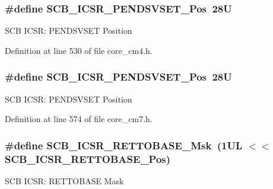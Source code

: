 \subsubsection[{\texorpdfstring{S\+C\+B\+\_\+\+I\+C\+S\+R\+\_\+\+P\+E\+N\+D\+S\+V\+S\+E\+T\+\_\+\+Pos}{SCB_ICSR_PENDSVSET_Pos}}]{\setlength{\rightskip}{0pt plus 5cm}\#define S\+C\+B\+\_\+\+I\+C\+S\+R\+\_\+\+P\+E\+N\+D\+S\+V\+S\+E\+T\+\_\+\+Pos~28U}\hypertarget{group___c_m_s_i_s___s_c_b_gab5ded23d2ab1d5ff7cc7ce746205e9fe}{}\label{group___c_m_s_i_s___s_c_b_gab5ded23d2ab1d5ff7cc7ce746205e9fe}
S\+CB I\+C\+SR\+: P\+E\+N\+D\+S\+V\+S\+ET Position 

Definition at line 530 of file core\+\_\+cm4.\+h.

\subsubsection[{\texorpdfstring{S\+C\+B\+\_\+\+I\+C\+S\+R\+\_\+\+P\+E\+N\+D\+S\+V\+S\+E\+T\+\_\+\+Pos}{SCB_ICSR_PENDSVSET_Pos}}]{\setlength{\rightskip}{0pt plus 5cm}\#define S\+C\+B\+\_\+\+I\+C\+S\+R\+\_\+\+P\+E\+N\+D\+S\+V\+S\+E\+T\+\_\+\+Pos~28U}\hypertarget{group___c_m_s_i_s___s_c_b_gab5ded23d2ab1d5ff7cc7ce746205e9fe}{}\label{group___c_m_s_i_s___s_c_b_gab5ded23d2ab1d5ff7cc7ce746205e9fe}
S\+CB I\+C\+SR\+: P\+E\+N\+D\+S\+V\+S\+ET Position 

Definition at line 574 of file core\+\_\+cm7.\+h.

\subsubsection[{\texorpdfstring{S\+C\+B\+\_\+\+I\+C\+S\+R\+\_\+\+R\+E\+T\+T\+O\+B\+A\+S\+E\+\_\+\+Msk}{SCB_ICSR_RETTOBASE_Msk}}]{\setlength{\rightskip}{0pt plus 5cm}\#define S\+C\+B\+\_\+\+I\+C\+S\+R\+\_\+\+R\+E\+T\+T\+O\+B\+A\+S\+E\+\_\+\+Msk~(1\+U\+L $<$$<$ S\+C\+B\+\_\+\+I\+C\+S\+R\+\_\+\+R\+E\+T\+T\+O\+B\+A\+S\+E\+\_\+\+Pos)}\hypertarget{group___c_m_s_i_s___s_c_b_gaca6fc3f79bb550f64fd7df782ed4a5f6}{}\label{group___c_m_s_i_s___s_c_b_gaca6fc3f79bb550f64fd7df782ed4a5f6}
S\+CB I\+C\+SR\+: R\+E\+T\+T\+O\+B\+A\+SE Mask 

